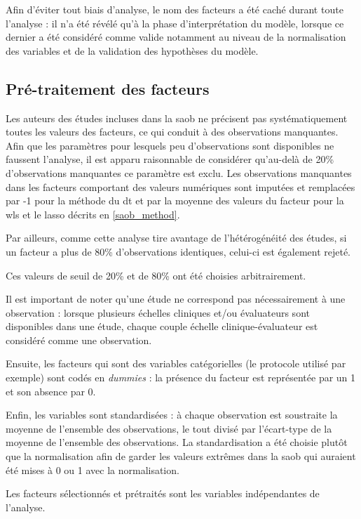 Afin d'éviter tout biais d'analyse, le nom des facteurs a été caché durant toute l'analyse : il n'a été révélé qu'à la phase d'interprétation du modèle, lorsque ce dernier a été considéré 
comme valide notamment au niveau de la normalisation des variables et de la validation des hypothèses du modèle.  

\subsection{Pré-traitement des facteurs} \label{preprocessing}

Les auteurs des études incluses dans la \gls{saob} ne précisent pas systématiquement toutes les valeurs des facteurs, ce qui conduit à des observations manquantes. 
Afin que les paramètres pour lesquels peu d'observations sont disponibles ne faussent l'analyse, il est apparu raisonnable de considérer qu'au-delà de 20\%
d'observations manquantes ce paramètre est exclu. Les observations manquantes dans les facteurs comportant des valeurs numériques sont 
imputées et remplacées par -1 pour la méthode du \gls{dt} et par la moyenne des valeurs du facteur pour la \gls{wls} et le \gls{lasso} décrits en \ref{saob_method}. 

Par ailleurs, comme cette analyse tire avantage de l'hétérogénéité des études, si un facteur a plus de 80\% d'observations identiques, 
celui-ci est également rejeté. 

Ces valeurs de seuil de 20\% et de 80\% ont été choisies arbitrairement.

Il est important de noter qu'une étude ne correspond pas nécessairement à une observation : lorsque plusieurs échelles cliniques et/ou évaluateurs sont disponibles dans une étude,
chaque couple échelle clinique-évaluateur est considéré comme une observation.

Ensuite, les facteurs qui sont des variables catégorielles (le protocole utilisé par exemple) sont codés en \textit{dummies} : la présence du facteur est représentée par un 1 et son absence par 0. 

Enfin, les variables sont standardisées : à chaque observation est soustraite la moyenne de l'ensemble des observations, le tout divisé par l'écart-type de la moyenne de 
l'ensemble des observations. La standardisation a été choisie plutôt que la normalisation afin de garder les valeurs extrêmes dans la \gls{saob} qui auraient été mises à 0 ou 1 avec 
la normalisation. 

Les facteurs sélectionnés et prétraités sont les variables indépendantes de l'analyse.

